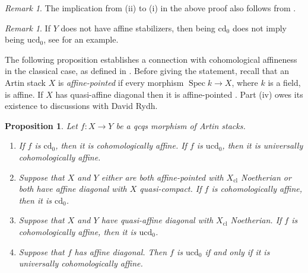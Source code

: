 \documentclass[a4paper,twoside,11pt]{amsart}
\theoremstyle{plain}
\newtheorem{proposition}[theorem]{Proposition}
\theoremstyle{definition}
\theoremstyle{remark}
\newtheorem{remark}[theorem]{Remark}
\numberwithin{equation}{section}
\newcommand{\cd}{\mathrm{cd}}
\newcommand{\ucd}{$\mathrm{ucd}_{0}$\xspace}
\renewcommand{\cd}{$\mathrm{cd}_{0}$\xspace}
\DeclareMathOperator{\Spec}{Spec} %
\newcommand{\cl}{\mathrm{cl}} %
\begin{document}
\begin{remark}
    The implication from (ii) to (i) in the above proof also follows from \cite[Lemma~2.2(6)]{HallRydhPerfect}.
\end{remark}

\begin{remark}
    If $Y$ does not have affine stabilizers, then being \cd does not imply being \ucd, see \cite[Rem.~1.6]{HallRydhGroups} for an example.
\end{remark}

The following proposition establishes a connection with cohomological affineness in the classical case, as defined in \cite{AlperGood}. Before giving the statement, recall that an Artin stack $X$ is \emph{affine-pointed} if every morphism $\Spec k \to X$, where $k$ is a field, is affine. If $X$ has quasi-affine diagonal then it is affine-pointed \cite[Lemma~4.6]{HRAffPointed}. Part (iv) owes its existence to discussions with David Rydh.

\begin{proposition}
\label{Prop:ucd0_props}
    Let $f \colon X \to Y$ be a qcqs morphism of Artin stacks.
    \begin{enumerate}
        \item If $f$ is \cd, then it is cohomologically affine. If $f$ is \ucd, then it is universally cohomologically affine.
        \item Suppose that $X$ and $Y$ either are both affine-pointed with $X_\cl$ Noetherian or both have affine diagonal with $X$ quasi-compact. If $f$ is cohomologically affine, then it is \cd. 
        \item Suppose that $X$ and $Y$ have quasi-affine diagonal with $X_\cl$ Noetherian. If $f$ is cohomologically affine, then it is \ucd.
        \item Suppose that $f$ has affine diagonal. Then $f$ is \ucd if and only if it is universally cohomologically affine.
    \end{enumerate}
\end{proposition}
\end{document}
